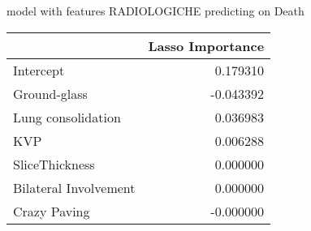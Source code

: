 model with features RADIOLOGICHE predicting on Death\newline
\begin{tabular}{lr}
\toprule
{} &  Lasso Importance \\
\midrule
Intercept             &          0.179310 \\
Ground-glass          &         -0.043392 \\
Lung consolidation    &          0.036983 \\
KVP                   &          0.006288 \\
SliceThickness        &          0.000000 \\
Bilateral Involvement &          0.000000 \\
Crazy Paving          &         -0.000000 \\
\bottomrule
\end{tabular}

